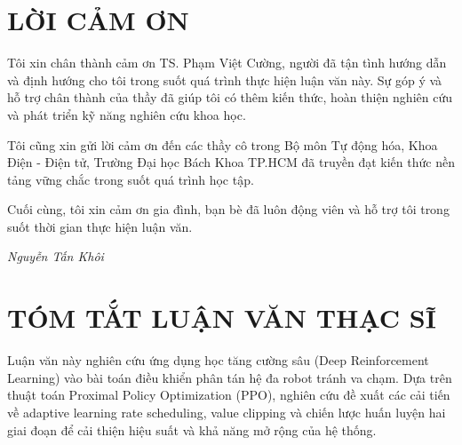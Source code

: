 

\chapter*{LỜI CẢM ƠN}

Tôi xin chân thành cảm ơn TS. Phạm Việt Cường, người đã tận tình hướng dẫn và định hướng cho tôi trong suốt quá trình thực hiện luận văn này. Sự góp ý và hỗ trợ chân thành của thầy đã giúp tôi có thêm kiến thức, hoàn thiện nghiên cứu và phát triển kỹ năng nghiên cứu khoa học.

Tôi cũng xin gửi lời cảm ơn đến các thầy cô trong Bộ môn Tự động hóa, Khoa Điện - Điện tử, Trường Đại học Bách Khoa TP.HCM đã truyền đạt kiến thức nền tảng vững chắc trong suốt quá trình học tập.

Cuối cùng, tôi xin cảm ơn gia đình, bạn bè đã luôn động viên và hỗ trợ tôi trong suốt thời gian thực hiện luận văn.

\vspace{1cm}
\begin{flushright}
\textit{Nguyễn Tấn Khôi}
\end{flushright}

\clearpage


\chapter*{TÓM TẮT LUẬN VĂN THẠC SĨ}

Luận văn này nghiên cứu ứng dụng học tăng cường sâu (Deep Reinforcement Learning) vào bài toán điều khiển phân tán hệ đa robot tránh va chạm. Dựa trên thuật toán Proximal Policy Optimization (PPO), nghiên cứu đề xuất các cải tiến về adaptive learning rate scheduling, value clipping và chiến lược huấn luyện hai giai đoạn để cải thiện hiệu suất và khả năng mở rộng của hệ thống.

